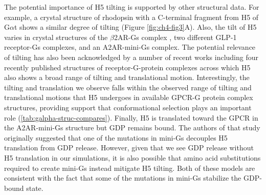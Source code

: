 \documentclass[../main.tex]{subfiles}
\begin{document}
        The potential importance of H5 tilting is supported by other structural data. For example, a crystal structure of rhodopsin\cite{Choe:2011cb} with a C-terminal fragment from H5 of G$\alpha$t shows a similar degree of tilting (Figure \ref{fig:ch4-fig3}A). Also, the tilt of H5 varies in crystal structures of the $\beta$2AR-Gs complex \cite{Rasmussen:2011kp}, two different GLP-1 receptor-Gs complexes\cite{Liang:2017cz,Zhang:2017gu}, and an A2AR-mini-Gs complex\cite{Carpenter:2016gr}. The potential relevance of tilting has also been acknowledged by a number of recent works\cite{Flock:2015dj,Rasmussen:2011kp,Oldham:2006kn} including four recently published structures of receptor-G-protein complexes across which H5 also shows a broad range of tilting and translational motion\cite{Koehl:2018fv,DraperJoyce:2018il,GarciaNafria:2018hu,Kang:2018kq}. Interestingly, the tilting and translation we observe falls within the observed range of tilting and translational motions that H5 undergoes in available GPCR-G protein complex structures\cite{Rasmussen:2011kp,Koehl:2018fv,DraperJoyce:2018il,GarciaNafria:2018hu,Kang:2018kq}, providing support that conformational selection plays an important role (\ref{tab:galpha-struc-compares}). Finally, H5 is translated toward the GPCR in the A2AR-mini-Gs structure but GDP remains bound\cite{Carpenter:2016gr}. The authors of that study originally suggested that one of the mutations in mini-Gs decouples H5 translation from GDP release. However, given that we see GDP release without H5 translation in our simulations, it is also possible that amino acid substitutions required to create mini-Gs instead mitigate H5 tilting. Both of these models are consistent with the fact that some of the mutations in mini-Gs stabilize the GDP-bound state\cite{Sun:2015gj}.
\end{document}
